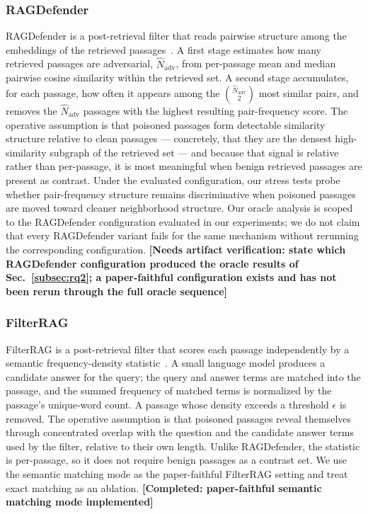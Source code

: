 \documentclass[conference]{IEEEtran}
\newcommand{\COMPLETED}[1]{\textbf{[Completed: #1]}}
\newcommand{\VERIFY}[1]{\textbf{[Needs artifact verification: #1]}}
\begin{document}
\subsubsection{RAGDefender}
RAGDefender is a post-retrieval filter that reads pairwise structure among the
embeddings of the retrieved passages~\cite{kim2025ragdefender}. A first stage
estimates how many retrieved passages are adversarial, $\widehat{N}_{\mathrm{adv}}$,
from per-passage mean and median pairwise cosine similarity within the retrieved
set. A second stage accumulates, for each passage, how often it appears among
the $\binom{\widehat{N}_{\mathrm{adv}}}{2}$ most similar pairs, and removes the
$\widehat{N}_{\mathrm{adv}}$ passages with the highest resulting pair-frequency
score. The operative assumption is that poisoned passages form detectable
similarity structure relative to clean passages --- concretely, that they are the
densest high-similarity subgraph of the retrieved set --- and because that signal
is relative rather than per-passage, it is most meaningful when benign retrieved
passages are present as contrast. Under the evaluated configuration, our stress
tests probe whether pair-frequency structure remains discriminative when poisoned
passages are moved toward cleaner neighborhood structure. Our oracle analysis is
scoped to the RAGDefender configuration evaluated in our experiments; we do not
claim that
every RAGDefender variant fails for the same mechanism without rerunning the
corresponding configuration.
\VERIFY{state which RAGDefender configuration produced the oracle results of
Sec.~\ref{subsec:rq2}; a paper-faithful configuration exists and has not been
rerun through the full oracle sequence}

\subsubsection{FilterRAG}
FilterRAG is a post-retrieval filter that scores each passage independently by a
semantic frequency-density statistic~\cite{edemacu2025filterrag}. A small
language model produces a candidate answer for the query; the query and answer
terms are matched into the passage, and the summed frequency of matched terms is
normalized by the passage's unique-word count. A passage whose density exceeds a
threshold $\epsilon$ is removed. The operative assumption is that poisoned
passages reveal themselves through concentrated overlap with the question and
the candidate answer terms used by the filter, relative to their own length.
Unlike RAGDefender, the statistic is per-passage, so it does not require benign
passages as a contrast set. We use the semantic matching mode as the
paper-faithful FilterRAG setting and treat exact matching as an ablation.
\COMPLETED{paper-faithful semantic matching mode implemented}
\end{document}
